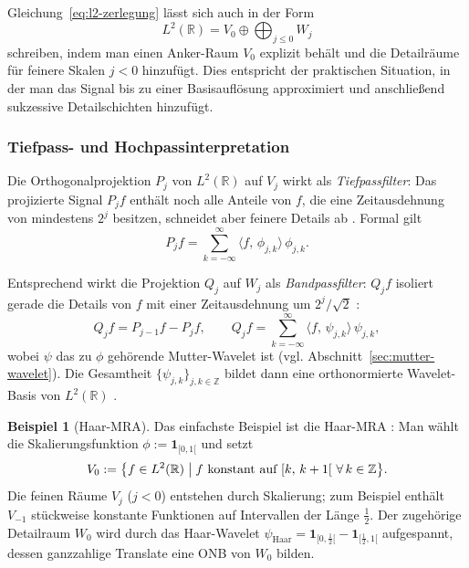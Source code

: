 \documentclass[a4paper,11pt,bibliography=totoc,listof=totoc,headinclude=true,cleardoublepage=empty,oneside]{scrbook}
\theoremstyle{definition}
\newtheorem{beispiel}[theorem]{Beispiel}
\theoremstyle{remark}
\begin{document}
   \medskip
   
   Gleichung~\eqref{eq:l2-zerlegung} lässt sich auch in der Form
   \begin{equation}
     \label{eq:l2-zerlegung-v0}
     L^2(\mathbb{R}) = V_0 \oplus \bigoplus_{j \leq 0} W_j
   \end{equation}
   schreiben, indem man einen Anker-Raum $V_0$ explizit behält und
   die Detailräume für feinere Skalen $j < 0$ hinzufügt.
   Dies entspricht der praktischen Situation, in der man das Signal
   bis zu einer Basisauflösung approximiert und anschließend sukzessive
   Detailschichten hinzufügt.
   
   \subsubsection{Tiefpass- und Hochpassinterpretation}
   \label{sec:mra-filter}
   
   Die Orthogonalprojektion $P_j$ von $L^2(\mathbb{R})$ auf $V_j$ wirkt
   als \emph{Tiefpassfilter}: Das projizierte Signal $P_j f$ enthält noch
   alle Anteile von $f$, die eine Zeitausdehnung von mindestens $2^j$
   besitzen, schneidet aber feinere Details ab
   \cite[S.\,107, 109]{blatterWaveletsEinfuhrung2003}.
   Formal gilt
   \begin{equation}
     P_j f = \sum_{k=-\infty}^{\infty} \langle f,\, \phi_{j,k} \rangle\, \phi_{j,k}.
   \end{equation}
   
   Entsprechend wirkt die Projektion $Q_j$ auf $W_j$ als
   \emph{Bandpassfilter}: $Q_j f$ isoliert gerade die Details von $f$
   mit einer Zeitausdehnung um $2^j/\sqrt{2}$
   \cite[S.\,109]{blatterWaveletsEinfuhrung2003}:
   \begin{equation}
     Q_j f = P_{j-1}f - P_j f,
     \qquad
     Q_j f = \sum_{k=-\infty}^{\infty} \langle f,\, \psi_{j,k} \rangle\, \psi_{j,k},
   \end{equation}
   wobei $\psi$ das zu $\phi$ gehörende Mutter-Wavelet ist
   (vgl. Abschnitt~\ref{sec:mutter-wavelet}).
   Die Gesamtheit $\{\psi_{j,k}\}_{j,k \in \mathbb{Z}}$ bildet dann
   eine orthonormierte Wavelet-Basis von $L^2(\mathbb{R})$
   \cite[S.\,110]{blatterWaveletsEinfuhrung2003}.
   
   \begin{beispiel}[Haar-MRA]
   \label{bsp:haar-mra}
   Das einfachste Beispiel ist die Haar-MRA
   \cite[S.\,107]{blatterWaveletsEinfuhrung2003}:
   Man wählt die Skalierungsfunktion $\phi := \mathbf{1}_{[0,1[}$ und setzt
   \[
     V_0 := \bigl\{f \in L^2(\mathbb{R}) \bigm| f \text{ konstant auf } [k,\,k+1[\ \forall\, k \in \mathbb{Z}\bigr\}.
   \]
   Die feinen Räume $V_j$ ($j < 0$) entstehen durch Skalierung; zum Beispiel
   enthält $V_{-1}$ stückweise konstante Funktionen auf Intervallen der
   Länge $\tfrac{1}{2}$. Der zugehörige Detailraum $W_0$ wird durch das
   Haar-Wavelet $\psi_{\mathrm{Haar}} = \mathbf{1}_{[0,\frac{1}{2}[} - \mathbf{1}_{[\frac{1}{2},1[}$
   aufgespannt, dessen ganzzahlige Translate eine ONB von $W_0$ bilden.
   \end{beispiel}
\end{document}
